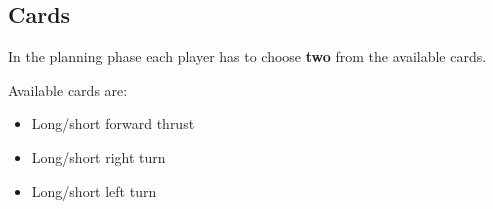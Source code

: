 \subsection{Cards}
In the planning phase each player has to choose \textbf{two} from the available cards.

Available cards are:
\begin{itemize}
    \item Long/short forward thrust
    \item Long/short right turn
    \item Long/short left turn
\end{itemize}
